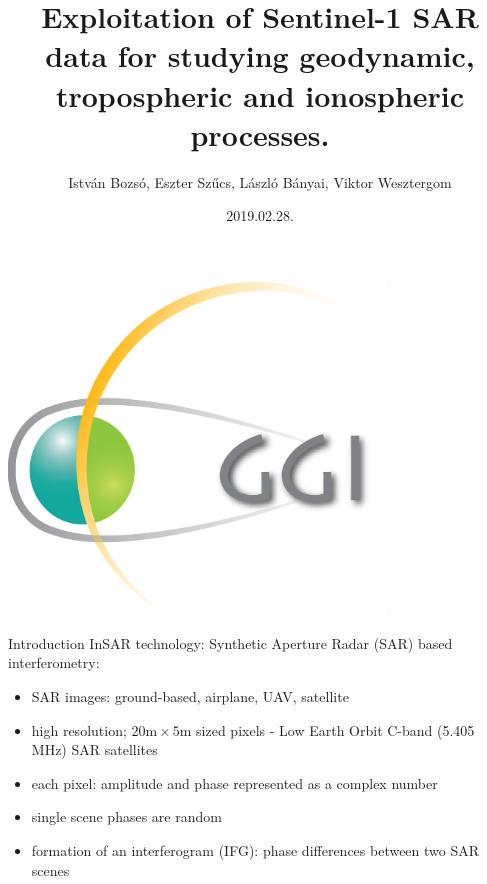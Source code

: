 \documentclass{beamer}
\title[H-SPACE, Budapest 2019]{Exploitation of Sentinel-1 SAR data for studying geodynamic, tropospheric and ionospheric processes.}
\author[Bozsó et al.]{István Bozsó, Eszter Szűcs, László Bányai, Viktor Wesztergom}
\institute[MTA CSFK GGI]{MTA CSFK Geodetic and Geophysical Institute}
\date{2019.02.28.}
\begin{document}
\begin{frame}
    \titlepage
    \begin{center}
        \begin{minipage}[c]{0.3\textwidth}
            \includegraphics[width=0.75\textwidth]{ggi_logo.png}
        \end{minipage}
    \end{center}
\end{frame}

\begin{frame}{Introduction}
    InSAR technology: Synthetic Aperture Radar (SAR) based interferometry:
    \begin{itemize}
        \item SAR images: ground-based, airplane, UAV, satellite
        \item high resolution; $20 \mathrm{m} \times 5 \mathrm{m}$ sized pixels - Low Earth Orbit C-band (5.405 MHz) SAR satellites
        \item each pixel: amplitude and phase represented as a complex number
        \item single scene phases are random
        \item formation of an interferogram (IFG): phase differences between two SAR scenes
    \end{itemize}
\end{frame}
\end{document}

